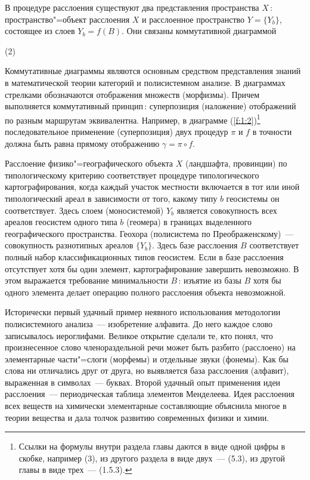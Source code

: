\documentclass[draft,openany,14pt]{extbook}
\begin{document}
В процедуре расслоения существуют два представления пространства $X$\,: пространство"=объект расслоения $X$ и расслоенное пространство $Y = \{Y_b\}$, состоящее из слоев $Y_b = f(B)$. Они связаны коммутативной диаграммой

(2)\label{f:1:2}

Коммутативные диаграммы являются основным средством представления знаний в математической теории категорий и полисистемном анализе. В диаграммах стрелками обозначаются отображения множеств (морфизмы). Причем выполняется коммутативный принцип\,: суперпозиция (наложение) отображений по разным маршрутам эквивалентна. Например, в диаграмме (\ref{f:1:2})\footnote{Ссылки на формулы внутри раздела главы даются в виде одной цифры в скобке, например (3), из другого раздела в виде двух~--- (5.3), из другой главы в виде трех~--- (1.5.3).} последовательное применение (суперпозиция) двух процедур $\pi{}$ и $f$ в точности должна быть равна прямому отображению $\gamma = \pi{} \circ{} f$.

Расслоение физико"=географического объекта $X$ (ландшафта, провинции) по типологическому критерию соответствует процедуре типологического картографирования, когда каждый участок местности включается в тот или иной типологический ареал в зависимости от того, какому типу $b$ геосистемы он соответствует. Здесь слоем (моносистемой) $Y_b$ является совокупность всех ареалов геосистем одного типа $b$ (геомера) в границах выделенного географического пространства. Геохора (полисистема по Преображенскому)~--- совокупность разнотипных ареалов $\{Y_b\}$. Здесь базе расслоения $B$ соответствует полный набор классификационных типов геосистем. Если в базе расслоения отсутствует хотя бы один элемент, картографирование завершить невозможно. В этом выражается требование минимальности $B$\,: изъятие из базы $B$ хотя бы одного элемента делает операцию полного расслоения объекта невозможной.

Исторически первый удачный пример неявного использования методологии полисистемного анализа~--- изобретение алфавита. До него каждое слово записывалось иероглифами. Великое открытие сделали те, кто понял, что произнесенное слово членораздельной речи может быть разбито (расслоено) на элементарные части"=слоги (морфемы) и отдельные звуки (фонемы). Как бы слова ни отличались друг от друга, но выявляется база расслоения (алфавит), выраженная в символах~--- буквах. Второй удачный опыт применения идеи расслоения~--- периодическая таблица элементов Менделеева.  Идея расслоения всех веществ на химически элементарные составляющие объяснила многое в теории вещества и дала толчок развитию современных физики и химии.
\end{document}

